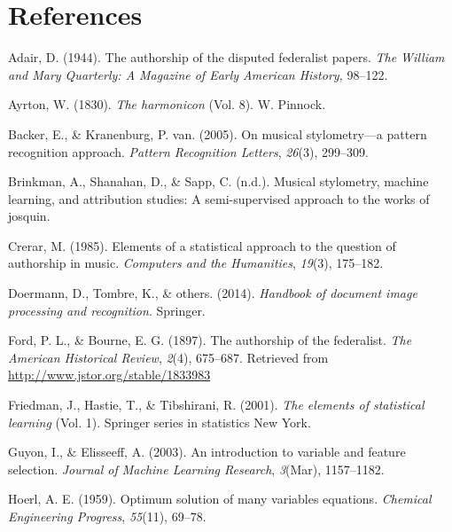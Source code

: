 \documentclass[12pt,twoside]{reedthesis}
\theoremstyle{definition}
\theoremstyle{definition}
\theoremstyle{definition}
\theoremstyle{remark}
\begin{document}
\chapter*{References}\label{references}


\noindent

\setlength{\parindent}{-0.20in} \setlength{\leftskip}{0.20in}
\setlength{\parskip}{8pt}

\hypertarget{refs}{}
\hypertarget{ref-adair1944}{}
Adair, D. (1944). The authorship of the disputed federalist papers.
\emph{The William and Mary Quarterly: A Magazine of Early American
History,} 98--122.

\hypertarget{ref-harmonicon}{}
Ayrton, W. (1830). \emph{The harmonicon} (Vol. 8). W. Pinnock.

\hypertarget{ref-backer2005}{}
Backer, E., \& Kranenburg, P. van. (2005). On musical stylometry---a
pattern recognition approach. \emph{Pattern Recognition Letters},
\emph{26}(3), 299--309.

\hypertarget{ref-brinkman2016}{}
Brinkman, A., Shanahan, D., \& Sapp, C. (n.d.). Musical stylometry,
machine learning, and attribution studies: A semi-supervised approach to
the works of josquin.

\hypertarget{ref-crerar}{}
Crerar, M. (1985). Elements of a statistical approach to the question of
authorship in music. \emph{Computers and the Humanities}, \emph{19}(3),
175--182.

\hypertarget{ref-OMR}{}
Doermann, D., Tombre, K., \& others. (2014). \emph{Handbook of document
image processing and recognition}. Springer.

\hypertarget{ref-authorshipfed}{}
Ford, P. L., \& Bourne, E. G. (1897). The authorship of the federalist.
\emph{The American Historical Review}, \emph{2}(4), 675--687. Retrieved
from \url{http://www.jstor.org/stable/1833983}

\hypertarget{ref-esl}{}
Friedman, J., Hastie, T., \& Tibshirani, R. (2001). \emph{The elements
of statistical learning} (Vol. 1). Springer series in statistics New
York.

\hypertarget{ref-guyon2003}{}
Guyon, I., \& Elisseeff, A. (2003). An introduction to variable and
feature selection. \emph{Journal of Machine Learning Research},
\emph{3}(Mar), 1157--1182.

\hypertarget{ref-hoer}{}
Hoerl, A. E. (1959). Optimum solution of many variables equations.
\emph{Chemical Engineering Progress}, \emph{55}(11), 69--78.
\end{document}
